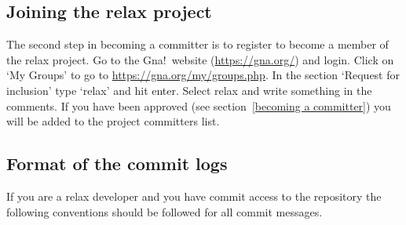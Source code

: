 \subsection{Joining the relax project}

The second step in becoming a committer is to register to become a member of the relax project.  Go to the Gna!\ website (\href{https://gna.org/}{https://gna.org/}) and login.  Click on `My Groups' to go to \href{https://gna.org/my/groups.php}{https://gna.org/my/groups.php}.  In the section `Request for inclusion' type `relax' and hit enter.  Select relax and write something in the comments.  If you have been approved (see section~\ref{becoming a committer}) you will be added to the project committers list.



\subsection{Format of the commit logs}\label{commit log format}

If you are a relax developer and you have commit access to the repository the following conventions should be followed for all commit messages.

